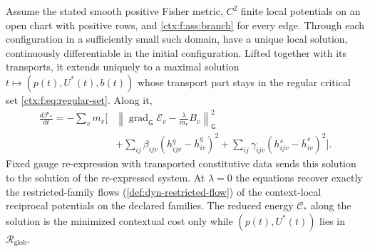 Assume the stated smooth positive Fisher metric, $C^2$ finite local potentials on an open chart with positive rows, and \cref{ctx:f:ass:branch} for every edge. Through each configuration in a sufficiently small such domain,  have a unique local solution, continuously differentiable in the initial configuration. Lifted together with its transports, it extends uniquely to a maximal solution $t\mapsto(p(t),U^*(t),b(t))$ whose transport part stays in the regular critical set \cref{ctx:f:eq:regular-set}. Along it,
\begin{align}
 \frac{d\mathcal F_*}{dt}
 =-\sum_v m_v\bigg[
  &\left\|\operatorname{grad}_{\mathsf G}\mathcal E_v-\frac{\lambda}{m_v}B_v\right\|_{\mathsf G}^2\nonumber\\
  &+\sum_{ij}\beta_{ijv}(h^q_{ijv}-\bar h^q_{iv})^2
   +\sum_{ij}\gamma_{ijv}(h^s_{ijv}-\bar h^s_{iv})^2\bigg].
 \label{ctx:f:eq:dissipation}
\end{align}
Fixed gauge re-expression with transported constitutive data sends this solution to the solution of the re-expressed system. At $\lambda=0$ the equations recover exactly the restricted-family flows (\cref{def:dyn-restricted-flow}) of the context-local reciprocal potentials on the declared families. The reduced energy $\mathcal C_*$ along the solution is the minimized contextual cost only while $(p(t),U^*(t))$ lies in $\mathcal R_{\mathrm{glob}}$.

